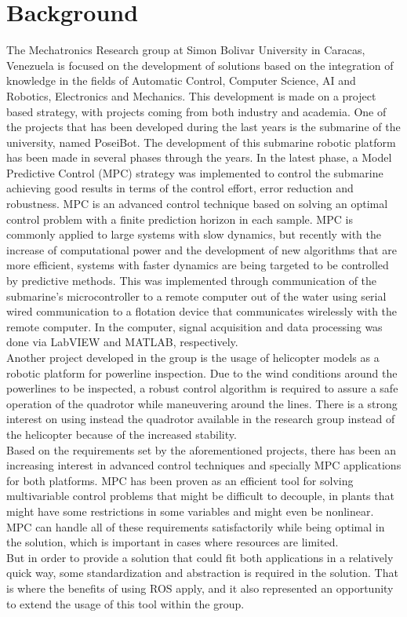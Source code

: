 \section{Background}
\label{chap:Background}

The Mechatronics Research group at Simon Bolivar University in Caracas, Venezuela is focused on the development of solutions based on the integration of knowledge in the fields of Automatic Control, Computer Science, AI and Robotics, Electronics and Mechanics. This development is made on a project based strategy, with projects coming from both industry and academia. One of the projects that has been developed during the last years is the submarine of the university, named PoseiBot. The development of this submarine robotic platform has been made in several phases through the years. In the latest phase, a Model Predictive Control (MPC) strategy was implemented to control the submarine achieving good results in terms of the control effort, error reduction and robustness. MPC is an advanced control technique based on solving an optimal control problem with a finite prediction horizon in each sample. MPC is commonly applied to large systems with slow dynamics, but recently with the increase of computational power and the development of new algorithms that are more efficient, systems with faster dynamics are being targeted to be controlled by predictive methods. This was implemented through communication of the submarine's microcontroller to a remote computer out of the water using serial wired communication to a flotation device that communicates wirelessly with the remote computer. In the computer, signal acquisition  and data processing was done via LabVIEW \texttrademark  and MATLAB\textsuperscript{\textregistered}, respectively. \\

Another project developed in the group is the usage of helicopter models as a robotic platform for powerline inspection. Due to the wind conditions around the powerlines to be inspected, a robust control algorithm is required to assure a safe operation of the quadrotor while maneuvering around the lines. There is a strong interest on using instead the quadrotor available in the research group instead of the helicopter because of the increased stability. \\

Based on the requirements set by the aforementioned projects, there has been an increasing interest in advanced control techniques and specially MPC applications for both platforms. MPC has been proven as an efficient tool for solving multivariable control problems that might be difficult to decouple, in plants that might have some restrictions in some variables and might even be nonlinear. MPC can handle all of these requirements satisfactorily while being optimal in the solution, which is important in cases where resources are limited.\\




But in order to provide a solution that could fit both applications in a relatively quick way, some standardization and abstraction is required in the solution. That is where the benefits of using ROS apply, and it also represented an opportunity to extend the usage of this tool within the group. 
